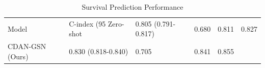 \begin{table}
\caption{Survival Prediction Performance}
\label{tab:performance}
\begin{tabular}{lllll}
\toprule
Model & C-index (95%
\midrule
Zero-shot & 0.805 (0.791-0.817) & 0.680 & 0.811 & 0.827 \\
CDAN-GSN (Ours) & 0.830 (0.818-0.840) & 0.705 & 0.841 & 0.855 \\
\bottomrule
\end{tabular}
\end{table}
